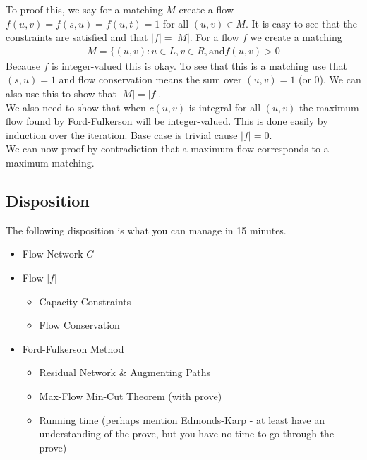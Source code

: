 To proof this, we say for a matching $M$ create a flow $f(u, v) = f(s, u) = f(u, t) = 1$ for all $(u, v) \in M$. It is easy to see that the constraints are satisfied and that $|f| = |M|$. For a flow $f$ we create a matching
\begin{align*}
	M = \{(u, v) : u \in L, v \in R, \text{and} f(u, v) > 0 
\end{align*}
Because $f$ is integer-valued this is okay. To see that this is a matching use that $(s, u) = 1$ and flow conservation means the sum over $(u, v) = 1$ (or $0$). We can also use this to show that $|M| = |f|$. \\

We also need to show that when $c(u, v)$ is integral for all $(u, v)$ the maximum flow found by Ford-Fulkerson will be integer-valued. This is done easily by induction over the iteration. Base case is trivial cause $|f| = 0$.\\

We can now proof by contradiction that a maximum flow corresponds to a maximum matching.

\subsection{Disposition}
The following disposition is what you can manage in 15 minutes. 
\begin{itemize}
	\item Flow Network $G$
	\item Flow $|f|$
		\begin{itemize}
			\item Capacity Constraints
			\item Flow Conservation
		\end{itemize}
	\item Ford-Fulkerson Method
		\begin{itemize}
			\item Residual Network \& Augmenting Paths
			\item Max-Flow Min-Cut Theorem (with prove)
			\item Running time (perhaps mention Edmonds-Karp - at least have an understanding of the prove, but you have no time to go through the prove)
		\end{itemize}
\end{itemize}
